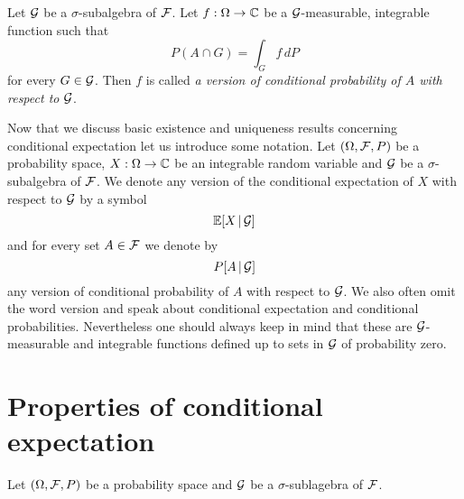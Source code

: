 \begin{definition}
Let ${\mathcal G}$ be a $\sigma$-subalgebra of ${\mathcal F}$. Let $f:\Omega \rightarrow {\mathbb C}$ be a ${\mathcal G}$-measurable, integrable function such that
$$P(A\cap G) = \int_G f\, dP$$
for every $G\in {\mathcal G}$. Then $f$ is called \textit{a version of conditional probability of $A$ with respect to ${\mathcal G}$}.
\end{definition}
\noindent
Now that we discuss basic existence and uniqueness results concerning conditional expectation let us introduce some notation. Let $(\Omega, {\mathcal F}, P)$ be a probability space, $X:\Omega \rightarrow {\mathbb C}$ be an integrable random variable and ${\mathcal G}$ be a $\sigma$-subalgebra of ${\mathcal F}$. We denote any version of the conditional expectation of $X$ with respect to ${\mathcal G}$ by a symbol
$${\mathbb E}[X\,|\,{\mathcal G}]$$ 
and for every set $A\in {\mathcal F}$ we denote by
$$P[A\,|\,{\mathcal G}]$$
any version of conditional probability of $A$ with respect to ${\mathcal G}$. We also often omit the word version and speak about conditional expectation and conditional probabilities. Nevertheless one should always keep in mind that these are ${\mathcal G}$-measurable and integrable functions defined up to sets in ${\mathcal G}$ of probability zero.

\section{Properties of conditional expectation}
\noindent
Let $(\Omega, {\mathcal F}, P)$ be a probability space and ${\mathcal G}$ be a $\sigma$-sublagebra of ${\mathcal F}$.

